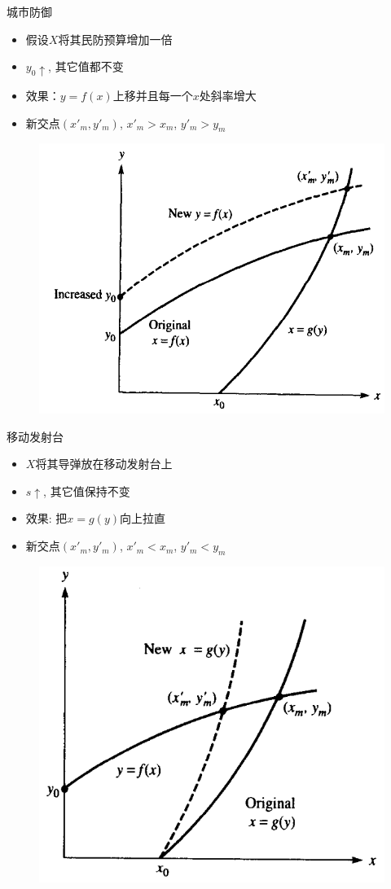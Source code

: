 \documentclass[UTF8]{ctexbeamer}
\begin{document}
\begin{frame}{城市防御}
  \begin{itemize}
  \item 假设$X$将其民防预算增加一倍
  \item $y_0\uparrow$, 其它值都不变
  \item 效果：$y=f(x)$上移并且每一个$x$处斜率增大
  \item 新交点$(x'_m, y'_m)$, $x'_m > x_m$, $y'_m > y_m$
  \end{itemize}

  \begin{figure}
    \centering
    \includegraphics[width=.5\textwidth]{cd.png}
  \end{figure}
  
\end{frame}

\begin{frame}{移动发射台}
  \begin{itemize}
  \item $X$将其导弹放在移动发射台上
  \item $s\uparrow$, 其它值保持不变
  \item 效果: 把$x=g(y)$向上拉直
  \item 新交点$(x'_m, y'_m)$, $x'_m < x_m$, $y'_m < y_m$
  \end{itemize}

  \begin{figure}
    \centering
    \includegraphics[width=.45\textwidth]{ml.png}
  \end{figure}

\end{frame}
\end{document}
